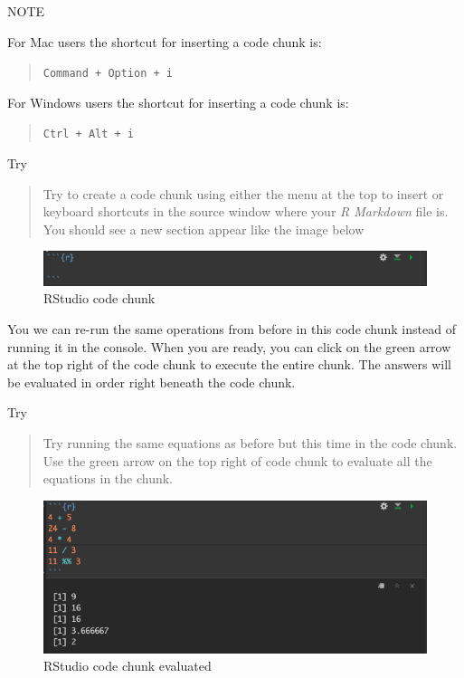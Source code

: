 \documentclass[
]{book}
\begin{document}
NOTE

For Mac users the shortcut for inserting a code chunk is:

\begin{quote}
\texttt{Command\ +\ Option\ +\ i}
\end{quote}

For Windows users the shortcut for inserting a code chunk is:

\begin{quote}
\texttt{Ctrl\ +\ Alt\ +\ i}
\end{quote}

Try

\begin{quote}
Try to create a code chunk using either the menu at the top to insert or keyboard shortcuts in the source window where your \emph{R Markdown} file is. You should see a new section appear like the image below
\end{quote}

\begin{figure}
\includegraphics[width=9.04in]{images/3.1codechunk} \caption{RStudio code chunk}\label{fig:unnamed-chunk-12}
\end{figure}

You we can re-run the same operations from before in this code chunk instead of running it in the console. When you are ready, you can click on the green arrow at the top right of the code chunk to execute the entire chunk. The answers will be evaluated in order right beneath the code chunk.

Try

\begin{quote}
Try running the same equations as before but this time in the code chunk. Use the green arrow on the top right of code chunk to evaluate all the equations in the chunk.
\end{quote}

\begin{figure}
\includegraphics[width=9.07in]{images/3.2codechunkgreen} \caption{RStudio code chunk evaluated}\label{fig:unnamed-chunk-13}
\end{figure}
\end{document}
